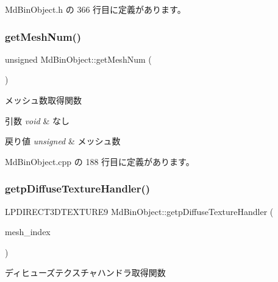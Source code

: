  Md\+Bin\+Object.\+h の 366 行目に定義があります。

\mbox{\label{class_md_bin_object_ad9fc54c8502548da439028d8a05b655c}} 
\subsubsection{\texorpdfstring{get\+Mesh\+Num()}{getMeshNum()}}
{\footnotesize\ttfamily unsigned Md\+Bin\+Object\+::get\+Mesh\+Num (\begin{DoxyParamCaption}{ }\end{DoxyParamCaption})}



メッシュ数取得関数 


\begin{DoxyParams}{引数}
{\em void} & なし \\
\hline
\end{DoxyParams}

\begin{DoxyRetVals}{戻り値}
{\em unsigned} & メッシュ数 \\
\hline
\end{DoxyRetVals}


 Md\+Bin\+Object.\+cpp の 188 行目に定義があります。

\mbox{\label{class_md_bin_object_af659a711251cd6689a883ca695117009}} 
\subsubsection{\texorpdfstring{getp\+Diffuse\+Texture\+Handler()}{getpDiffuseTextureHandler()}}
{\footnotesize\ttfamily L\+P\+D\+I\+R\+E\+C\+T3\+D\+T\+E\+X\+T\+U\+R\+E9 Md\+Bin\+Object\+::getp\+Diffuse\+Texture\+Handler (\begin{DoxyParamCaption}\item[{unsigned}]{mesh\+\_\+index }\end{DoxyParamCaption})}



ディヒューズテクスチャハンドラ取得関数 


